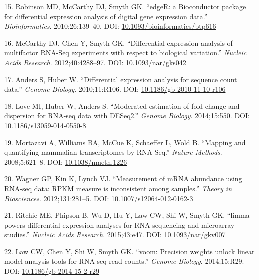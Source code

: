 \documentclass[11pt,a4paper,titlepage,twoside,openright]{style/unimelbthesis}
\theoremstyle{definition}
\theoremstyle{definition}
\theoremstyle{definition}
\theoremstyle{remark}
\begin{document}
\begin{mainmatter}
\leavevmode\hypertarget{ref-Robinson2010-pt}{}%
15. Robinson MD, McCarthy DJ, Smyth GK. ``edgeR: a Bioconductor package for differential expression analysis of digital gene expression data.'' \emph{Bioinformatics}. 2010;26:139--40. DOI: \href{https://doi.org/10.1093/bioinformatics/btp616}{10.1093/bioinformatics/btp616}

\leavevmode\hypertarget{ref-McCarthy2012-gc}{}%
16. McCarthy DJ, Chen Y, Smyth GK. ``Differential expression analysis of multifactor RNA-Seq experiments with respect to biological variation.'' \emph{Nucleic Acids Research}. 2012;40:4288--97. DOI: \href{https://doi.org/10.1093/nar/gks042}{10.1093/nar/gks042}

\leavevmode\hypertarget{ref-Anders2010-pq}{}%
17. Anders S, Huber W. ``Differential expression analysis for sequence count data.'' \emph{Genome Biology}. 2010;11:R106. DOI: \href{https://doi.org/10.1186/gb-2010-11-10-r106}{10.1186/gb-2010-11-10-r106}

\leavevmode\hypertarget{ref-Love2014-tw}{}%
18. Love MI, Huber W, Anders S. ``Moderated estimation of fold change and dispersion for RNA-seq data with DESeq2.'' \emph{Genome Biology}. 2014;15:550. DOI: \href{https://doi.org/10.1186/s13059-014-0550-8}{10.1186/s13059-014-0550-8}

\leavevmode\hypertarget{ref-Mortazavi2008-vu}{}%
19. Mortazavi A, Williams BA, McCue K, Schaeffer L, Wold B. ``Mapping and quantifying mammalian transcriptomes by RNA-Seq.'' \emph{Nature Methods}. 2008;5:621--8. DOI: \href{https://doi.org/10.1038/nmeth.1226}{10.1038/nmeth.1226}

\leavevmode\hypertarget{ref-Wagner2012-qf}{}%
20. Wagner GP, Kin K, Lynch VJ. ``Measurement of mRNA abundance using RNA-seq data: RPKM measure is inconsistent among samples.'' \emph{Theory in Biosciences}. 2012;131:281--5. DOI: \href{https://doi.org/10.1007/s12064-012-0162-3}{10.1007/s12064-012-0162-3}

\leavevmode\hypertarget{ref-Ritchie2015-te}{}%
21. Ritchie ME, Phipson B, Wu D, Hu Y, Law CW, Shi W, Smyth GK. ``limma powers differential expression analyses for RNA-sequencing and microarray studies.'' \emph{Nucleic Acids Research}. 2015;43:e47. DOI: \href{https://doi.org/10.1093/nar/gkv007}{10.1093/nar/gkv007}

\leavevmode\hypertarget{ref-Law2014-nq}{}%
22. Law CW, Chen Y, Shi W, Smyth GK. ``voom: Precision weights unlock linear model analysis tools for RNA-seq read counts.'' \emph{Genome Biology}. 2014;15:R29. DOI: \href{https://doi.org/10.1186/gb-2014-15-2-r29}{10.1186/gb-2014-15-2-r29}


\end{mainmatter}
\end{document}
